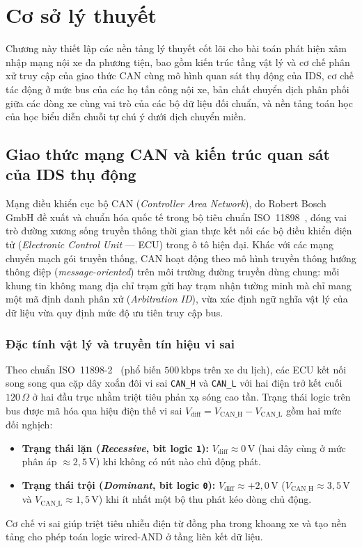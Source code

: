 \documentclass[12pt, a4paper, reqno, oneside]{book}
\DeclareRobustCommand{\code}[1]{\nolinkurl{#1}}
\begin{document}
\chapter{Cơ sở lý thuyết}\label{chap:background}
Chương này thiết lập các nền tảng lý thuyết cốt lõi cho bài toán phát hiện xâm nhập mạng nội xe đa phương tiện, bao gồm kiến trúc tầng vật lý và cơ chế phân xử truy cập của giao thức CAN cùng mô hình quan sát thụ động của IDS, cơ chế tác động ở mức bus của các họ tấn công nội xe, bản chất chuyển dịch phân phối giữa các dòng xe cùng vai trò của các bộ dữ liệu đối chuẩn, và nền tảng toán học của học biểu diễn chuỗi tự chú ý dưới dịch chuyển miền.

\section{Giao thức mạng CAN và kiến trúc quan sát của IDS thụ động}
Mạng điều khiển cục bộ CAN (\textit{Controller Area Network}), do Robert Bosch GmbH đề xuất và chuẩn hóa quốc tế trong bộ tiêu chuẩn ISO~11898~\cite{bosch1991can,iso11898_1_2015,iso11898_2_2016}, đóng vai trò đường xương sống truyền thông thời gian thực kết nối các bộ điều khiển điện tử (\textit{Electronic Control Unit} --- ECU) trong ô tô hiện đại. Khác với các mạng chuyển mạch gói truyền thống, CAN hoạt động theo mô hình truyền thông hướng thông điệp (\textit{message-oriented}) trên môi trường đường truyền dùng chung: mỗi khung tin không mang địa chỉ trạm gửi hay trạm nhận tường minh mà chỉ mang một mã định danh phân xử (\textit{Arbitration ID}), vừa xác định ngữ nghĩa vật lý của dữ liệu vừa quy định mức độ ưu tiên truy cập bus.

\subsection{Đặc tính vật lý và truyền tín hiệu vi sai}
Theo chuẩn ISO~11898-2~\cite{iso11898_2_2016} (phổ biến $500\,\text{kbps}$ trên xe du lịch), các ECU kết nối song song qua cặp dây xoắn đôi vi sai \code{CAN_H} và \code{CAN_L} với hai điện trở kết cuối $120\,\Omega$ ở hai đầu trục nhằm triệt tiêu phản xạ sóng cao tần. Trạng thái logic trên bus được mã hóa qua hiệu điện thế vi sai $V_{\text{diff}} = V_{\text{CAN\_H}} - V_{\text{CAN\_L}}$ gồm hai mức đối nghịch:
\begin{itemize}
    \item \textbf{Trạng thái lặn (\textit{Recessive}, bit logic \texttt{1}):} $V_{\text{diff}} \approx 0\,\text{V}$ (hai dây cùng ở mức phân áp $\approx 2{,}5\,\text{V}$) khi không có nút nào chủ động phát.
    \item \textbf{Trạng thái trội (\textit{Dominant}, bit logic \texttt{0}):} $V_{\text{diff}} \approx +2{,}0\,\text{V}$ ($V_{\text{CAN\_H}} \approx 3{,}5\,\text{V}$ và $V_{\text{CAN\_L}} \approx 1{,}5\,\text{V}$) khi ít nhất một bộ thu phát kéo dòng chủ động.
\end{itemize}
Cơ chế vi sai giúp triệt tiêu nhiễu điện từ đồng pha trong khoang xe và tạo nền tảng cho phép toán logic wired-AND ở tầng liên kết dữ liệu.
\end{document}
